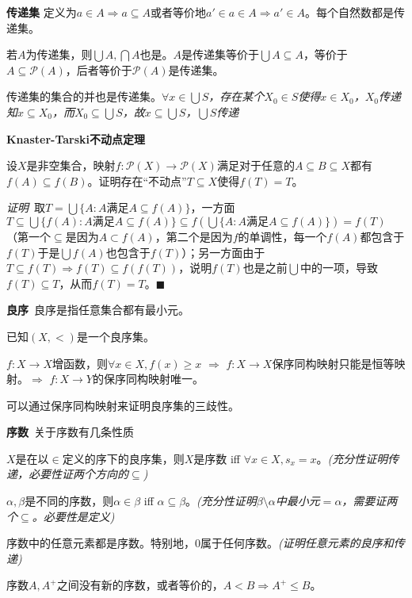 \documentclass[UTF-8]{ctexart}
\begin{document}
\textbf{传递集} 定义为$a \in A \Rightarrow a \subseteq A$或者等价地$a' \in a \in A \Rightarrow a' \in A$。每个自然数都是传递集。

若$A$为传递集，则$\bigcup A, \bigcap A$也是。$A$是传递集等价于$\bigcup A \subseteq A$，等价于$A \subseteq \mathcal P(A)$，后者等价于$\mathcal P(A)$是传递集。

传递集的集合的并也是传递集。\textit{$\forall x \in \bigcup S$，存在某个$X_0 \in S$使得$x \in X_0$，$X_0$传递知$x \subseteq X_0$，而$X_0 \subseteq \bigcup S$，故$x \subseteq \bigcup S$，$\bigcup S$传递}

\textbf{Knaster-Tarski不动点定理}

设$X$是非空集合，映射$f: \mathcal P(X) \to \mathcal P(X)$满足对于任意的$A \subseteq B \subseteq X$都有$f(A) \subseteq f(B)$。证明存在“不动点”$T \subseteq X$使得$f(T) = T$。

\textit{证明}\ 取$T = \bigcup\{A: A\mbox{满足}A \subseteq f(A)\}$，一方面$T \subseteq \bigcup\{f(A): A\mbox{满足}A \subseteq f(A)\} \subseteq f(\bigcup\{A: A\mbox{满足}A \subseteq f(A)\}) = f(T)$（第一个$\subseteq$是因为$A \subset f(A)$，第二个是因为$f$的单调性，每一个$f(A)$都包含于$f(T)$于是$\bigcup f(A)$也包含于$f(T)$）；另一方面由于$T \subseteq f(T) \Rightarrow f(T) \subseteq f(f(T))$，说明$f(T)$也是之前$\bigcup$中的一项，导致$f(T) \subseteq T$，从而$f(T) = T$。\hfill$\blacksquare$


\textbf{良序}\ 良序是指任意集合都有最小元。

已知$(X, <)$是一个良序集。

$f: X \to X$增函数，则$\forall x \in X, f(x) \ge x$ $\Rightarrow$ $f: X \to X$保序同构映射只能是恒等映射。$\Rightarrow$ $f: X \to Y$的保序同构映射唯一。

可以通过保序同构映射来证明良序集的三歧性。

\newpage

\textbf{序数}\ 关于序数有几条性质

$X$是在以$\in$定义的序下的良序集，则$X$是序数 iff $\forall x \in X, s_x = x$。\textit{(充分性证明传递，必要性证两个方向的$\subseteq$)}

$\alpha, \beta$是不同的序数，则$\alpha \in \beta$ iff $\alpha \subseteq \beta$。\textit{(充分性证明$\beta \setminus \alpha$中最小元$= \alpha$，需要证两个$\subseteq$。必要性是定义)}

序数中的任意元素都是序数。特别地，$0$属于任何序数。\textit{(证明任意元素的良序和传递)}

序数$A, A^+$之间没有新的序数，或者等价的，$A < B \Rightarrow A^+ \le B$。
\end{document}
